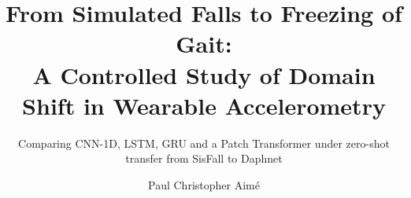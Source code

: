 \documentclass{template}
\begin{document}
\title{From Simulated Falls to Freezing of Gait:\\ A Controlled Study of Domain Shift in Wearable Accelerometry}
\subtitle{Comparing CNN-1D, LSTM, GRU and a Patch Transformer under zero-shot transfer from SisFall to Daphnet}
\author{Paul Christopher Aim\'e}










\footnotesize
\printbibliography[heading=bibintoc,title={References}]
\normalsize

\appendix

\end{document}
